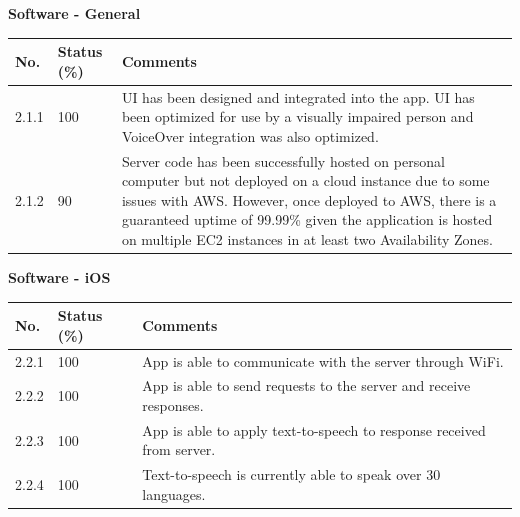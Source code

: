 \documentclass[a4paper,11pt]{article}
\begin{document}
\textbf{Software - General}
\begin{table}[ht]
    \centering
    \begin{tabular}{|p{0.7cm}|p{1cm}|p{12cm}|}
        \hline
        No. & Status (\%) & Comments \\ \hline
        
        2.1.1 & 100 & UI has been designed and integrated into the app. UI has been optimized for use by a visually impaired person and VoiceOver integration was also optimized. \\ \hline
        
        2.1.2 & 90 & Server code has been successfully hosted on personal computer but not deployed on a cloud instance due to some issues with AWS. However, once deployed to AWS, there is a guaranteed uptime of 99.99\% given the application is hosted on multiple EC2 instances in at least two Availability Zones. \cite{aws-uptime} \\ \hline
    \end{tabular}
\end{table}

\newpage
\textbf{Software - iOS}
\begin{table}[ht]
    \centering
    \begin{tabular}{|p{0.7cm}|p{1cm}|p{12cm}|}
        \hline
        No. & Status (\%) & Comments \\ \hline
        
        2.2.1 & 100 & App is able to communicate with the server through WiFi. \\ \hline
        
        2.2.2 & 100 & App is able to send requests to the server and receive responses. \\ \hline
        
        2.2.3 & 100 & App is able to apply text-to-speech to response received from server. \\ \hline
        
        2.2.4 & 100 & Text-to-speech is currently able to speak over 30 languages. \cite{voiceover-langs} \\ \hline
    \end{tabular}
\end{table}
\end{document}

